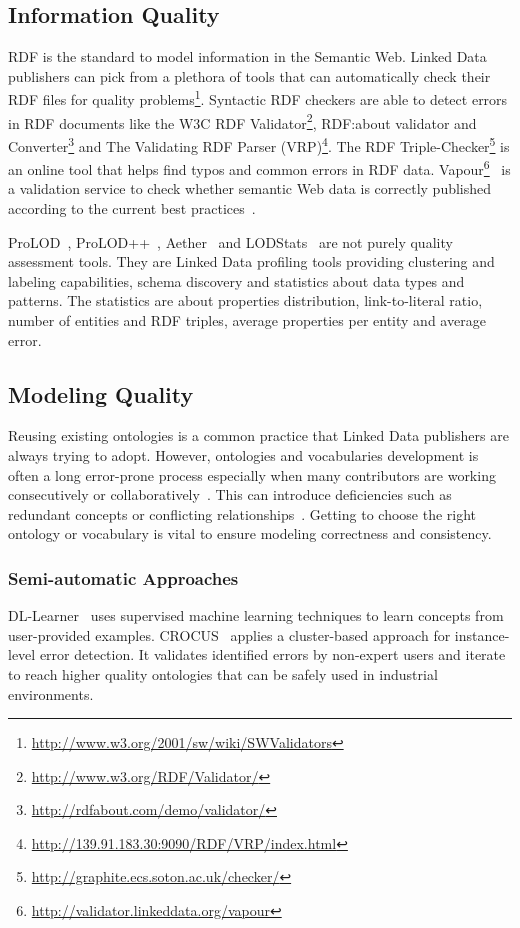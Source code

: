 \documentclass[onecolumn, crcready]{../../Util/LaTEX/iosart2c}
\begin{document}
\subsection{Information Quality}
RDF is the standard to model information in the Semantic Web. Linked Data publishers can pick from a plethora of tools that can automatically check their RDF files for quality problems\footnote{\url{http://www.w3.org/2001/sw/wiki/SWValidators}}. Syntactic RDF checkers are able to detect errors in RDF documents like the W3C RDF Validator\footnote{\url{http://www.w3.org/RDF/Validator/}}, RDF:about validator and Converter\footnote{\url{http://rdfabout.com/demo/validator/}} and The Validating RDF Parser (VRP)\footnote{\url{http://139.91.183.30:9090/RDF/VRP/index.html}}. The RDF Triple-Checker\footnote{\url{http://graphite.ecs.soton.ac.uk/checker/}} is an online tool that helps find typos and common errors in RDF data. Vapour\footnote{\url{http://validator.linkeddata.org/vapour}}~\cite{Berrueta:SFSW:08} is a validation service to check whether semantic Web data is correctly published according to the current best practices~\cite{Berners-Lee:W3C:06}.

ProLOD~\cite{Bohm:ICDEW:10}, ProLOD++~\cite{Abedjan:ICDE:14}, Aether~\cite{Makela:ESWC:14} and LODStats~\cite{Auer:EKAW:12} are not purely quality assessment tools. They are Linked Data profiling tools providing clustering and labeling capabilities, schema discovery and statistics about data types and patterns. The statistics are about properties distribution, link-to-literal ratio, number of entities and RDF triples, average properties per entity and average error.

\subsection{Modeling Quality}
Reusing existing ontologies is a common practice that Linked Data publishers are always trying to adopt. However, ontologies and vocabularies development is often a long error-prone process especially when many contributors are working consecutively or collaboratively~\cite{Suominen:DataSemantics:13}. This can introduce deficiencies such as redundant concepts or conflicting relationships~\cite{Harpring:Getty:10}. Getting to choose the right ontology or vocabulary is vital to ensure modeling correctness and consistency.

\subsubsection{Semi-automatic Approaches}
DL-Learner~\cite{Lehmann:MLResearch:09} uses supervised machine learning techniques to learn concepts from user-provided examples. CROCUS~\cite{Cherix:WASABI:14} applies a cluster-based approach for instance-level error detection. It validates identified errors by non-expert users and iterate to reach higher quality ontologies that can be safely used in industrial environments.
\end{document}
